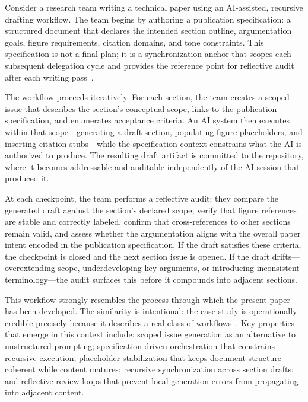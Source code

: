 Consider a research team writing a technical paper using an AI-assisted, recursive drafting workflow. The team begins by authoring a publication specification: a structured document that declares the intended section outline, argumentation goals, figure requirements, citation domains, and tone constraints. This specification is not a final plan; it is a synchronization anchor that scopes each subsequent delegation cycle and provides the reference point for reflective audit after each writing pass~\cite{Parnas1972Modularization}.

The workflow proceeds iteratively. For each section, the team creates a scoped issue that describes the section's conceptual scope, links to the publication specification, and enumerates acceptance criteria. An AI system then executes within that scope---generating a draft section, populating figure placeholders, and inserting citation stubs---while the specification context constrains what the AI is authorized to produce. The resulting draft artifact is committed to the repository, where it becomes addressable and auditable independently of the AI session that produced it.

At each checkpoint, the team performs a reflective audit: they compare the generated draft against the section's declared scope, verify that figure references are stable and correctly labeled, confirm that cross-references to other sections remain valid, and assess whether the argumentation aligns with the overall paper intent encoded in the publication specification. If the draft satisfies these criteria, the checkpoint is closed and the next section issue is opened. If the draft drifts---overextending scope, underdeveloping key arguments, or introducing inconsistent terminology---the audit surfaces this before it compounds into adjacent sections.

This workflow strongly resembles the process through which the present  paper has been developed. The similarity is intentional: the case study is operationally credible precisely because it describes a real class of workflows~\cite{Hutchins1995CognitionWild}. Key  properties that emerge in this context include: scoped issue generation as an alternative to unstructured prompting; specification-driven orchestration that constrains recursive execution; placeholder stabilization that keeps document structure coherent while content matures; recursive synchronization across section drafts; and reflective review loops that prevent local generation errors from propagating into adjacent content.

